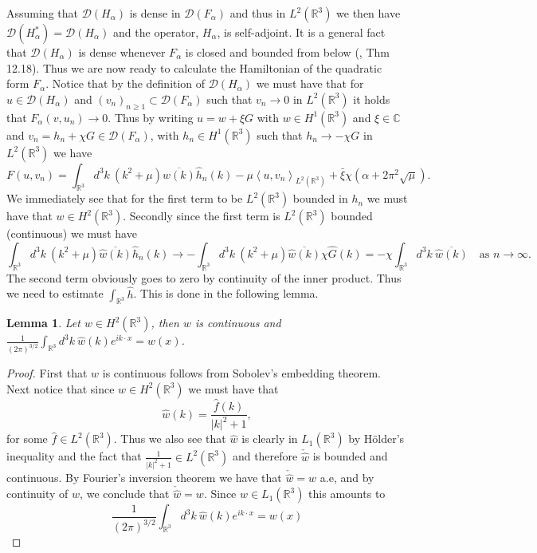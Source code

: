 \documentclass[a4paper,11pt]{article}
\newcommand{\dom}[1]{\mathscr D\left(#1\right)}
\renewcommand{\braket}[1]{\left\langle#1\right\rangle}
\newcommand{\R}{\mathbb{R}}
\newcommand{\C}{\mathbb{C}}
\newtheorem{lemma}{Lemma}
\numberwithin{equation}{section}
\begin{document}
Assuming that $ \dom{H_\alpha} $ is dense in $ \dom{F_\alpha} $ and thus in $ L^2(\R^3) $ we then have $ \dom{H_\alpha^*}=\dom{H_\alpha} $ and the operator, $ H_\alpha $, is self-adjoint. It is a general fact that $ \dom{H_\alpha} $ is dense whenever $ F_\alpha $ is closed and bounded from below (\cite{grubb2008distributions}, Thm 12.18). Thus we are now ready to calculate the Hamiltonian of the quadratic form $ F_\alpha $. Notice that by the definition of $ \dom{H_\alpha} $ we must have that for $ u\in\dom{H_\alpha} $ and $  (v_n)_{n\geq1}\subset\dom{F_\alpha} $  such that $ v_n\to0 $ in $ L^2(\R^3) $ it holds that  $ F_\alpha(v,u_n)\to 0 $. Thus by writing $ u=w+\xi G $ with $ w\in H^1(\R^3) $ and $ \xi\in\C $ and $ v_n=h_n+\chi G\in\dom{F_\alpha} $, with $ h_n\in H^1(\R^3) $ such that $ h_n\to-\chi G $ in $ L^2(\R^3) $ we have \begin{equation}
F(u,v_n)=\int_{\R^3} d^3k\ \left(k^2+\mu\right)\overline{\hat{w}(k)}\hat{h}_n(k)-\mu\braket{u,v_n}_{L^2(\R^3)}+\bar{\xi}\chi\left(\alpha+2\pi^2\sqrt{\mu}\right).
\end{equation}
We immediately see that for the first term to be $ L^2(\R^3) $ bounded in $ h_n $ we must have that $ w\in H^2(\R^3) $. Secondly since the first term is $ L^2(\R^3) $ bounded (continuous) we must have \begin{equation}
\int_{\R^3} d^3k\ \left(k^2+\mu\right)\overline{\hat{w}(k)}\hat{h}_n(k)\to-\int_{\R^3} d^3k\ \left(k^2+\mu\right)\overline{\hat{w}(k)}\chi \hat{G}(k)=-\chi\int_{\R^3} d^3k\ \overline{\hat{w}(k)}\quad \text{as }n\to\infty.
\end{equation} 
The second term obviously goes to zero by continuity of the inner product. Thus we need to estimate $ \int_{\R^3}\hat{h} $. This is done in the following lemma.
\begin{lemma}
	Let $ w\in H^2(\R^3) $, then $ w $ is continuous and $ \frac{1}{(2\pi)^{3/2}}\int_{\R^3}d^3k\ \hat{w}(k)e^{ik\cdot x}=w(x) $.
\end{lemma}
\begin{proof}
	First that $ w $ is continuous follows from Sobolev's embedding theorem. Next notice that since $ w\in H^2(\R^3) $ we must have that \begin{equation}
	\hat{w}(k)=\frac{\hat{f}(k)}{|k|^2+1},
	\end{equation}
	for some $ \hat{f}\in L^2(\R^3) $. Thus we also see that $ \hat{w} $ is clearly in $ L_1(\R^3) $ by H\"older's inequality and the fact that $ \frac{1}{|k|^2+1}\in L^2(\R^3) $ and therefore $ \check{\hat{w}} $ is bounded and continuous. By Fourier's inversion theorem we have that $ \check{\hat{w}}=w $ a.e, and by continuity of $ w $, we conclude that $ \check{\hat{w}}=w $. Since $ \hat{w}\in L_1(\R^3) $ this amounts to \begin{equation}
	\frac{1}{(2\pi)^{3/2}}\int_{\R^3}d^3k\ \hat{w}(k)e^{ik\cdot x}=w(x) 
	\end{equation}
\end{proof}
\end{document}
